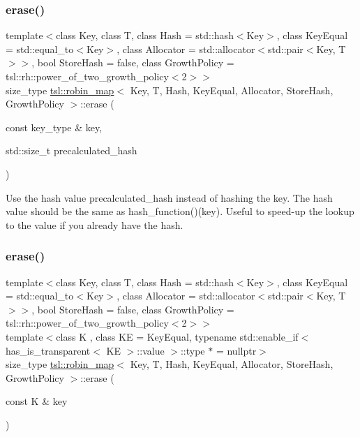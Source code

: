 \subsubsection{\texorpdfstring{erase()}{erase()}\hspace{0.1cm}{\footnotesize\ttfamily [1/3]}}
{\footnotesize\ttfamily template$<$class Key, class T, class Hash = std\+::hash$<$\+Key$>$, class Key\+Equal = std\+::equal\+\_\+to$<$\+Key$>$, class Allocator = std\+::allocator$<$std\+::pair$<$\+Key, T$>$$>$, bool Store\+Hash = false, class Growth\+Policy = tsl\+::rh\+::power\+\_\+of\+\_\+two\+\_\+growth\+\_\+policy$<$2$>$$>$ \\
size\+\_\+type \mbox{\hyperlink{classtsl_1_1robin__map}{tsl\+::robin\+\_\+map}}$<$ Key, T, Hash, Key\+Equal, Allocator, Store\+Hash, Growth\+Policy $>$\+::erase (\begin{DoxyParamCaption}\item[{const key\+\_\+type \&}]{key,  }\item[{std\+::size\+\_\+t}]{precalculated\+\_\+hash }\end{DoxyParamCaption})\hspace{0.3cm}{\ttfamily [inline]}}

Use the hash value \textquotesingle{}precalculated\+\_\+hash\textquotesingle{} instead of hashing the key. The hash value should be the same as hash\+\_\+function()(key). Useful to speed-\/up the lookup to the value if you already have the hash. \mbox{\label{classtsl_1_1robin__map_ad334f47f1ed306461539be804c5ec303}} 
\subsubsection{\texorpdfstring{erase()}{erase()}\hspace{0.1cm}{\footnotesize\ttfamily [2/3]}}
{\footnotesize\ttfamily template$<$class Key, class T, class Hash = std\+::hash$<$\+Key$>$, class Key\+Equal = std\+::equal\+\_\+to$<$\+Key$>$, class Allocator = std\+::allocator$<$std\+::pair$<$\+Key, T$>$$>$, bool Store\+Hash = false, class Growth\+Policy = tsl\+::rh\+::power\+\_\+of\+\_\+two\+\_\+growth\+\_\+policy$<$2$>$$>$ \\
template$<$class K , class KE  = Key\+Equal, typename std\+::enable\+\_\+if$<$ has\+\_\+is\+\_\+transparent$<$ K\+E $>$\+::value $>$\+::type $\ast$  = nullptr$>$ \\
size\+\_\+type \mbox{\hyperlink{classtsl_1_1robin__map}{tsl\+::robin\+\_\+map}}$<$ Key, T, Hash, Key\+Equal, Allocator, Store\+Hash, Growth\+Policy $>$\+::erase (\begin{DoxyParamCaption}\item[{const K \&}]{key }\end{DoxyParamCaption})\hspace{0.3cm}{\ttfamily [inline]}}


